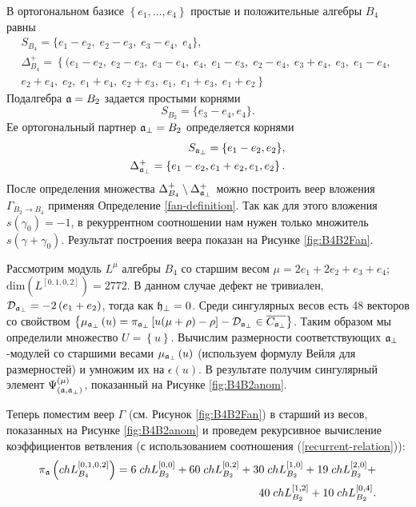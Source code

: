 В ортогональном базисе $\left\{e_1,\dots,e_4\right\}$ простые и положительные алгебры $B_4$ равны
\begin{eqnarray*}
  \label{eq:19}
  S_{B_4}= \{e_1 - e_2,\; e_2 - e_3,\; e_3 - e_4,\; e_4\},\\[2mm]
 \Delta^+_{B_4}=\left\{ (e_1 - e_2,\; e_2 - e_3,\; e_3 - e_4,\; e_4,\; e_1 - e_3,\; e_2 - e_4,\; e_3 + e_4,\; e_3,\; e_1 - e_4,\;\right.\\
 \left. e_2 + e_4,\; e_2,\; e_1 + e_4,\; e_2 + e_3,\; e_1,\; e_1 + e_3,\; e_1 + e_2\right\}
\end{eqnarray*}
Подалгебра  $\mathfrak{a}=B_2$ задается простыми корнями
\begin{equation*}
  \label{eq:26}
 S_{B_2}=\{e_3-e_4,e_4\}.
\end{equation*}
Ее ортогональный партнер $\mathfrak{a}_{\perp}=B_2$ определяется корнями
\begin{eqnarray*}
  \label{eq:27}
  S_{\mathfrak{a}_{\perp}}=\{e_1-e_2,e_2\},\\
 \Delta^{+}_{\mathfrak{a}_{\perp}}= \left\{e_1-e_2,e_1+e_2,e_1,e_2\right\}.
\end{eqnarray*}
После определения множества $\Delta^+_{B_4} \setminus  \Delta^{+}_{\mathfrak{a}_{\perp}}$ можно построить веер вложения $\Gamma_{B_2 \to B_4}$ применяя Определение \ref{fan-definition}. Так как для этого вложения $s\left( \gamma_0\right)=-1$, в рекуррентном соотношении нам нужен только множитель $s\left(\gamma + \gamma_0\right)$. Результат построения веера показан на Рисунке \ref{fig:B4B2Fan}.

Рассмотрим модуль $L^{\mu}$ алгебры  $B_4$ со старшим весом $\mu=2e_1 + 2 e_2 + e_3 + e_4$; \,
$\mathrm{dim}(L^{\left[0,1,0,2\right]})=2772$.
В данном случае дефект не тривиален, $\mathcal{D}_{\mathfrak{a}_{\perp }}=-2\left( e_1 + e_2 \right)$, тогда как $\mathfrak{h}_{\bot}=0$. Среди сингулярных весов есть 
48 векторов со свойством $\left\{ \mu _{\mathfrak{a}_{\perp}}\left( u\right) =\pi _{\mathfrak{a}_{\perp }}\left[ u(\mu +\rho)-\rho \right] -\mathcal{D}_{\mathfrak{a}_{\perp}}\in \overline{C_{\mathfrak{a}_{\perp}}}\right\} $.
Таким образом мы определили множество $U=\left\{ u \right\}$. Вычислим размерности соответствующих  $\mathfrak{a}_{\perp}$-модулей со старшими весами $\mu_{\mathfrak{a}_{\perp}}\left( u\right)$ (используем формулу Вейля для размерностей) и умножим их на $\epsilon\left( u \right)$. В результате получим сингулярный элемент
$\Psi ^{\left( \mu \right) }_{\left(  \mathfrak{a}, \mathfrak{a}_{\perp} \right)}$, показанный на Рисунке \ref{fig:B4B2anom}.

Теперь поместим веер  $\Gamma$ (см. Рисунок \ref{fig:B4B2Fan}) в старший из весов, показанных на Рисунке \ref{fig:B4B2anom} и проведем рекурсивное вычисление коэффициентов ветвления (с использованием соотношения (\ref{recurrent-relation})):
\begin{eqnarray*}
  \label{eq:24}
  \pi_{\mathfrak{a}} \left(ch L^{\left[0,1,0,2\right]}_{B_4}\right) = 6 \; ch L^{\left[0,0\right]}_{B_2}+ 60
  \; ch L_{B_2}^{\left[0,2\right]}+ 30 \; ch L_{B_2}^{\left[1,0\right]}+ 19 \; ch L_{B_2}^{\left[2,0\right]}+\\
  40 \; ch L_{B_2}^{\left[1,2\right]}+ 10 \; ch L_{B_2}^{\left[0,4\right]}.
\end{eqnarray*}

